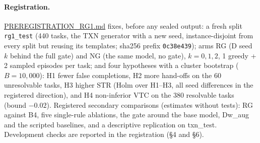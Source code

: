 \documentclass[11pt]{article}
\newcommand{\code}[1]{\texttt{\small #1}}
\begin{document}
\paragraph{Registration.} \url{PREREGISTRATION_RG1.md} fixes, before any sealed output: a fresh split
\code{rg1\_test} (440 tasks, the TXN generator with a new seed, instance-disjoint from every split but reusing its
templates; sha256 prefix \code{0c38e439}); arms RG (D seed $k$ behind the full gate) and NG (the same model, no gate),
$k=0,1,2$, 1 greedy + 2 sampled episodes per task; and four hypotheses with a cluster bootstrap ($B=10{,}000$): H1
fewer false completions, H2 more hand-offs on the 60 unresolvable tasks, H3 higher STR (Holm over H1--H3, all seed
differences in the registered direction), and H4 non-inferior VTC on the 380 resolvable tasks (bound $-0.02$).
Registered secondary comparisons (estimates without tests): RG against B4, five single-rule ablations, the gate around the base
model, Dw\_aug and the scripted baselines, and a descriptive replication on txn\_test. Development checks are reported
in the registration (\S4 and \S6).

\begin{table}[t]
\centering\footnotesize
\setlength{\tabcolsep}{2.5pt}
\caption{RG1 registered results (\url{results/rg1/rg1_summary.json}; interpretation in \url{PREREGISTRATION_RG1_ADDENDUM2.md}: H1 is close to guaranteed by construction and H2 is mostly relabelling). Seeds
0--2, 1 greedy + 2 sampled episodes per task, cluster bootstrap with $B=10{,}000$. H1--H3: supported iff Holm $p<0.05$
and all three seed differences have the registered sign (H1: NG$-$RG $>0$). H4: supported iff the lower 95\% bound of
RG$-$NG is above $-0.02$. S1 is a registered estimate without a test.}
\label{tab:rg1}
\end{table}
\end{document}
